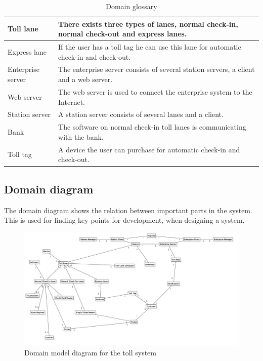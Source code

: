 \begin{center}
\begin{table}[!ht]
\begin{tabular}{ | l | p{10cm} | }
    Toll lane               &   There exists three types of lanes, normal check-in, normal check-out and express lanes. \\ \hline
    Express lane            &   If the user has a toll tag he can use this lane for automatic check-in and check-out. \\ \hline
    Enterprise server       &   The enterprise server consists of several station servers, a client and a web server. \\ \hline
    Web server              &   The web server is used to connect the enterprise system to the Internet. \\ \hline
    Station server          &   A station server consists of several lanes and a client. \\ \hline
    Bank                    &   The software on normal check-in toll lanes is communicating with the bank. \\ \hline
    Toll tag                &   A device the user can purchase for automatic check-in and check-out. \\ \hline
    \end{tabular}
    \caption{Domain glossary}
    \label{tab:bfs_dfs}
\end{table}    
\end{center}

\newpage
\subsection{Domain diagram}
The domain diagram shows the relation between important parts in the system. This is used for finding key points for development, when designing a system.

\begin{figure}[!ht]
  \begin{center}
    \includegraphics[width=1\textwidth]{figures/domain_model.jpg} 
  \end{center}
  \caption{Domain model diagram for the toll system}
\end{figure}